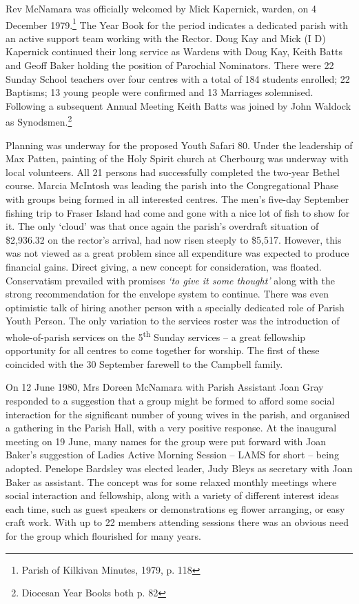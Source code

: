 Rev McNamara was officially welcomed by Mick Kapernick, warden, on 4 December 1979.\footnote{Parish of Kilkivan Minutes, 1979, p. 118} The Year Book for the period indicates a dedicated parish with an active support team working with the Rector. Doug Kay and Mick (I D) Kapernick continued their long service as Wardens with Doug Kay, Keith Batts and Geoff Baker holding the position of Parochial Nominators. There were 22 Sunday School teachers over four centres with a total of 184 students enrolled; 22 Baptisms; 13 young people were confirmed and 13 Marriages solemnised. Following a subsequent Annual Meeting Keith Batts was joined by John Waldock as Synodsmen.\footnote{Diocesan Year Books both p. 82}


Planning was underway for the proposed Youth Safari 80. Under the leadership of Max Patten, painting of the Holy Spirit church at Cherbourg was underway with local volunteers. All 21 persons had successfully completed the two-year Bethel course. Marcia McIntosh was leading the parish into the Congregational Phase with groups being formed in all interested centres. The men's five-day September fishing trip to Fraser Island had come and gone with a nice lot of fish to show for it. The only `cloud' was that once again the parish's overdraft situation of \$2,936.32 on the rector's arrival, had now risen steeply to \$5,517. However, this was not viewed as a great problem since all expenditure was expected to produce financial gains. Direct giving, a new concept for consideration, was floated. Conservatism prevailed with promises \emph{`to give it some thought'} along with the strong recommendation for the envelope system to continue. There was even optimistic talk of hiring another person with a specially dedicated role of Parish Youth Person. The only variation to the services roster was the introduction of whole-of-parish services on the 5\textsuperscript{th} Sunday services -- a great fellowship opportunity for all centres to come together for worship. The first of these coincided with the 30 September farewell to the Campbell family.



On 12 June 1980, Mrs Doreen McNamara with Parish Assistant Joan Gray responded to a suggestion that a group might be formed to afford some social interaction for the significant number of young wives in the parish, and organised a gathering in the Parish Hall, with a very positive response. At the inaugural meeting on 19 June, many names for the group were put forward with Joan Baker's suggestion of Ladies Active Morning Session -- LAMS for short -- being adopted. Penelope Bardsley was elected leader, Judy Bleys as secretary with Joan Baker as assistant. The concept was for some relaxed monthly meetings where social interaction and fellowship, along with a variety of different interest ideas each time, such as guest speakers or demonstrations eg flower arranging, or easy craft work. With up to 22 members attending sessions there was an obvious need for the group which flourished for many years.



